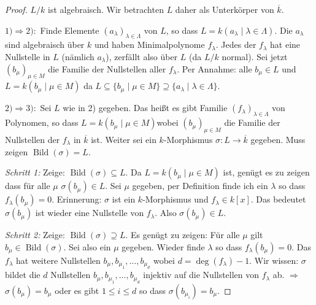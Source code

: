 \documentclass[12pt,parskip=full]{scrartcl}
\newcommand{\heading}{\underline}
\theoremstyle{definition}
\theoremstyle{remark}
\begin{document}
	\begin{proof}
		$L/k$ ist algebraisch. Wir betrachten $L$ daher als Unterkörper von $\overline{k}$.
		
		\heading{$1) \Rightarrow 2):$} Finde Elemente $(a_\lambda)_{\lambda \in \Lambda}$ von $L$, so dass $L = k(a_\lambda \mid \lambda \in \Lambda)$. Die $a_\lambda$ sind algebraisch über $k$ und haben Minimalpolynome $f_\lambda$. Jedes der $f_\lambda$ hat eine Nullstelle in $L$ (nämlich $a_\lambda$), zerfällt also über $L$ (da $L/k$ normal). Sei jetzt $(b_\mu)_{\mu \in M}$ die Familie der Nullstellen aller $f_\lambda$. Per Annahme: alle $b_\mu \in L$ und $L = k(b_\mu \mid \mu \in M)$ da $L \subseteq \{ b_\mu \mid \mu \in M \} \supseteq \{ a_\lambda \mid \lambda \in \Lambda \}$.
		
		\heading{$2) \Rightarrow 3):$} Sei $L$ wie in 2) gegeben. Das heißt es gibt Familie $(f_\lambda)_{\lambda \in \Lambda}$ von Polynomen, so dass $L = k(b_\mu \mid \mu \in M)$wobei $(b_\mu)_{\mu \in M}$ die Familie der Nullstellen der $f_\lambda$ in $\overline{k}$ ist. Weiter sei ein $k$-Morphismus $\sigma: L \to \overline{k}$ gegeben. Muss zeigen $\operatorname{Bild}(\sigma) = L$.
		
		\textit{Schritt 1:} Zeige: $\operatorname{Bild}(\sigma) \subseteq L$. Da $L = k(b_\mu \mid \mu \in M)$ ist, genügt es zu zeigen dass für alle $\mu$ $\sigma(b_\mu) \in L$. Sei $\mu$ gegeben, per Definition finde ich ein $\lambda$ so dass $f_\lambda(b_\mu) = 0$. Erinnerung: $\sigma$ ist ein $k$-Morphismus und $f_\lambda \in k[x]$. Das bedeutet $\sigma(b_\mu)$ ist wieder eine Nullstelle von $f_\lambda$. Also $\sigma(b_\mu) \in L$.
		
		\textit{Schritt 2:} Zeige: $\operatorname{Bild}(\sigma) \supseteq L$. Es genügt zu zeigen: Für alle $\mu$ gilt $b_\mu \in \operatorname{Bild}(\sigma)$. Sei also ein $\mu$ gegeben. Wieder finde $\lambda$ so dass $f_\lambda(b_\mu) = 0$. Das $f_\lambda$ hat weitere Nullstellen $b_\mu, b_{\mu_1}, \dots, b_{\mu_d}$ wobei $d = \deg(f_\lambda) - 1$. Wir wissen: $\sigma$ bildet die $d$ Nullstellen $b_\mu, b_{\mu_1}, \dots, b_{\mu_d}$ injektiv auf die Nullstellen von $f_\lambda$ ab. $\Rightarrow$ $\sigma(b_\mu) = b_\mu$ oder es gibt $1 \leq i \leq d$ so dass $\sigma(b_{\mu_i}) = b_\mu$.
		

\end{proof}
\end{document}
